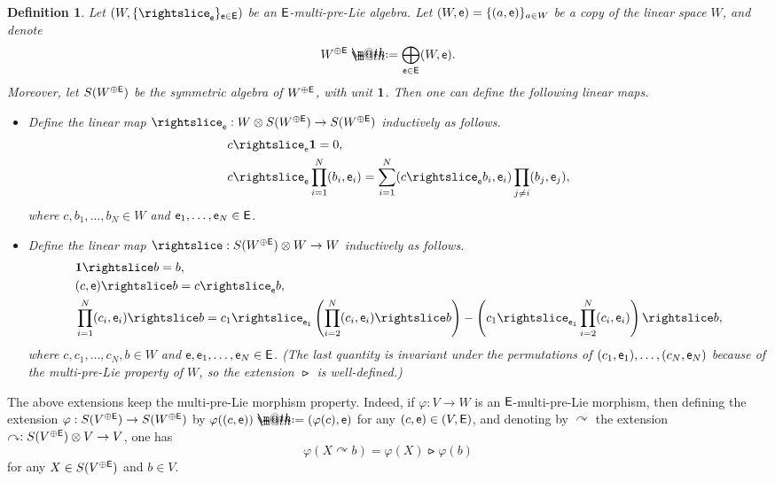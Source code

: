 \documentclass[10pt, reqno]{amsart}
\makeatletter
\numberwithin{subsection}{section}
\numberwithin{subsubsection}{subsection}
\numberwithin{equation}{section} %
\theoremstyle{mystyle}
\theoremstyle{mystyle2}
\newtheorem*{defn*} {Definition}
\theoremstyle{mystyle3}
\newcommand*{\defeq}{\mathrel{\rlap{%
                     \raisebox{0.3ex}{$\m@th\cdot$}}%
                     \raisebox{-0.3ex}{$\m@th\cdot$}}%
                     =}
\makeatother
\begin{document}
\begin{defn*}
Let $(W,\{\rightslice_{\sf {e}}\}_{\sf{e}\in\sf{E}})$ be an $\sf E$-multi-pre-Lie algebra.
Let $(W,{\sf e})=\{(a,{\sf e})\}_{a\in W}$ be a copy of the linear space $W$, and denote
$$
W^{\oplus{\sf E}} \defeq  \bigoplus_{\sf e\in E}(W,{\sf e}).
$$
Moreover, let $S(W^{\oplus{\sf E}})$ be the symmetric algebra of $W^{\oplus{\sf E}}$, with unit $\bf 1$. Then one can define the following linear maps.
\begin{itemize}
\setlength{\itemsep}{0.15cm}
\item Define the linear map $\rightslice_{\sf e}:W\otimes S(W^{\oplus{\sf 
E}})\to S(W^{\oplus{\sf E}})$ inductively as follows.
\begin{align*}
&c\rightslice_{\sf e}{\bf1}=0,   \\
&c\rightslice_{\sf e}\prod_{i=1}^N (b_i,{\sf e}_i)=\sum_{i=1}^N(c\rightslice_{\sf e}b_i,{\sf e}_i)\prod_{j\neq i}(b_j,{\sf e}_j),
\end{align*}
where $c,b_1,\dots,b_N\in W$ and ${\sf e}_1,\dots,{\sf e}_N\in{\sf E}$.
\item Define the linear map $\rightslice:S(W^{\oplus{\sf E}})\otimes W\to 
W$ inductively as follows.
\begin{align*}
&{\bf1}\rightslice b=b,\\
&(c,{\sf e})\rightslice b=c\rightslice_{\sf e}b,\\
&\prod_{i=1}^N (c_i,{\sf e}_i)\rightslice b = c_1\rightslice_{{\sf e}_1}\left(\prod_{i=2}^N(c_i,{\sf e}_i)\rightslice b\right) - \left(c_1\rightslice_{{\sf e}_1}\prod_{i=2}^N(c_i,{\sf e}_i)\right)\rightslice b,
\end{align*}
where $c,c_1,\dots,c_N,b\in W$ and ${\sf e},{\sf e}_1,\dots,{\sf e}_N\in{\sf E}$. (The last quantity is invariant under the permutations of $(c_1,{\sf e}_1),\dots,(c_N,{\sf e}_N)$ because of the multi-pre-Lie property of $W$, so the extension $\rightslice$ is well-defined.)
\end{itemize}
\end{defn*}

\medskip

The above extensions keep the multi-pre-Lie morphism property.
Indeed, if $\varphi:V\to W$ is an $\sf E$-multi-pre-Lie morphism, then defining the extension $\varphi:S(V^{\oplus{\sf E}})\to S(W^{\oplus{\sf E}})$ by $\varphi((c,{\sf e})) \defeq  (\varphi(c),{\sf e})$ for any $(c,{\sf e})\in(V,{\sf E})$, and denoting by $\curvearrowright$ the extension $\curvearrowright:S(V^{\oplus{\sf E}})\otimes V\to V$, one has
$$
\varphi(X\curvearrowright b)=\varphi(X)\rightslice\varphi(b)
$$
for any $X\in S(V^{\oplus{\sf E}})$ and $b\in V$.
\end{document}
